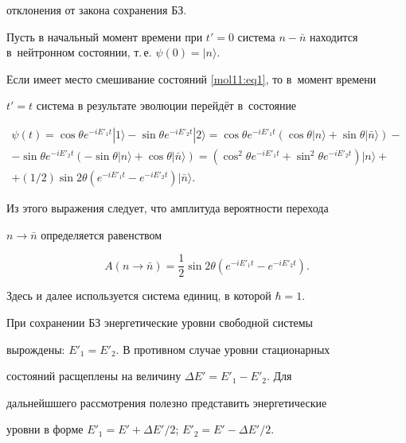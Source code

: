  отклонения от закона сохранения БЗ.



 Пусть в начальный момент времени при $t' = 0$  система  $n {-} \bar  n$ находится в~нейтронном состоянии, т.\,е. $\psi(0) = |n \rangle$.

Если  имеет место смешивание состояний \eqref{mol11:eq1}, то в~момент времени

 $t' = t$ система в результате эволюции перейдёт в~состояние

  \begin{multline*}

         \psi(t) = \cos \theta e^{-i E'_1 t}  |1 \rangle - \sin \theta e^{-i E'_2 t} |2 \rangle

          = \cos \theta e^{-i E'_1 t} (\cos \theta |n \rangle + \sin \theta |\bar  n \rangle) -  \\

        - \sin \theta e^{-i E'_2 t} (-\sin \theta |n \rangle + \cos \theta |\bar  n \rangle)

        = (\cos^2 \theta   e^{-i E'_1 t} + \sin^2 \theta e^{-i E'_2 t}) |n \rangle +\\

        +  (1/2) \sin 2 \theta (e^{-i E'_1 t} - e^{-i E'_2 t})  |\bar  n \rangle.

 \end{multline*}

 Из этого выражения следует, что амплитуда вероятности перехода 

 $n \to \bar  n$  определяется равенством

 \begin{equation} \label{mol11:eq2}

 A(n \to \bar  n) =  \frac 1 2 \sin 2\theta ( e^{-i E'_1 t} -

 e^{-i E'_2 t}).

 \end{equation}

 Здесь и далее используется система единиц, в которой $\hbar = 1$.



 При сохранении БЗ энергетические уровни свободной системы

 вырождены: $E'_ 1 = E'_2$. В противном случае уровни стационарных

 состояний расщеплены на величину $\Delta E' = E'_1 - E'_2$. Для

 дальнейшшего рассмотрения полезно представить энергетические

 уровни в форме $E'_1 {=} E' + {\Delta  E'}/{2}$; \mbox{$E'_2 {=} E' - {\Delta  E'}/{2}$.}

